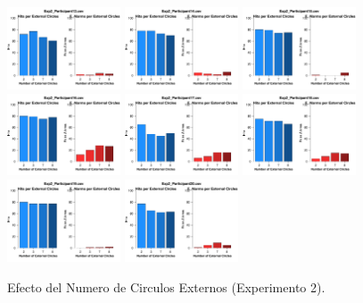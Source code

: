 \begin{figure}[th]
\includegraphics[width=0.30\textwidth]{Figures/Numero_Exp2_P13} \includegraphics[width=0.30\textwidth]{Figures/Numero_Exp2_P14} \includegraphics[width=0.30\textwidth]{Figures/Numero_Exp2_P15}
\includegraphics[width=0.30\textwidth]{Figures/Numero_Exp2_P16} \includegraphics[width=0.30\textwidth]{Figures/Numero_Exp2_P17} \includegraphics[width=0.30\textwidth]{Figures/Numero_Exp2_P18}
\includegraphics[width=0.30\textwidth]{Figures/Numero_Exp2_P19} \includegraphics[width=0.30\textwidth]{Figures/Numero_Exp2_P20} 
\caption[Numero_Exp2]{Efecto del Numero de Circulos Externos (Experimento 2).}
\label{fig:Numero_E2}
\end{figure}


